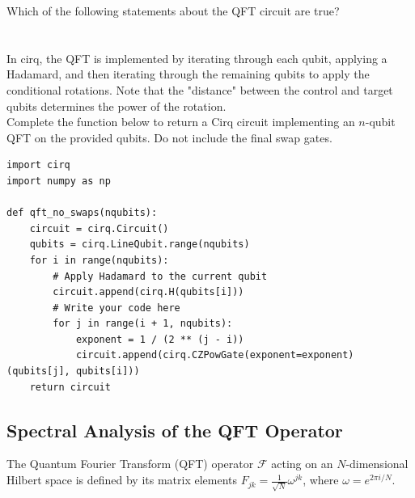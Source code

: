 Which of the following statements about the QFT circuit are true? \\
\noindent{} 
\newline \\ \\
In cirq, the QFT is implemented by iterating through each qubit, applying a Hadamard, and then iterating through the remaining qubits to apply the conditional rotations. Note that the "distance" between the control and target qubits determines the power of the rotation. \\

Complete the function below to return a Cirq circuit implementing an $n$-qubit QFT on the provided qubits. Do not include the final swap gates.


\begin{lstlisting}
import cirq
import numpy as np

def qft_no_swaps(nqubits):
    circuit = cirq.Circuit()
    qubits = cirq.LineQubit.range(nqubits)
    for i in range(nqubits):
        # Apply Hadamard to the current qubit
        circuit.append(cirq.H(qubits[i]))
        # Write your code here
        for j in range(i + 1, nqubits):
            exponent = 1 / (2 ** (j - i))
            circuit.append(cirq.CZPowGate(exponent=exponent)(qubits[j], qubits[i]))
    return circuit

\end{lstlisting}


\newpage
\subsection{Spectral Analysis of the QFT Operator}
The Quantum Fourier Transform (QFT) operator $\mathcal{F}$ acting on an $N$-dimensional Hilbert space is defined by its matrix elements $F_{jk} = \frac{1}{\sqrt{N}}\omega^{jk}$, where $\omega = e^{2\pi i /N}$.

